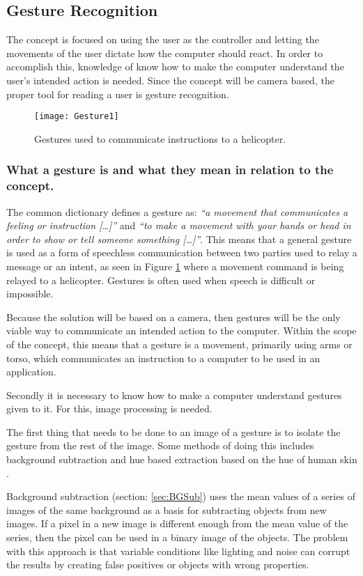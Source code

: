 \subsection{Gesture Recognition}
The concept is focused on using the user as the controller and letting the movements of the user dictate how the computer should react. In order to accomplish this, knowledge of know how to make the computer understand the user’s intended action is needed. Since the concept will be camera based, the proper tool for reading a user is gesture recognition.
\bigskip

\begin{figure}[h] 
\centering
\texttt{[image: Gesture1]} 
\caption{Gestures used to communicate instructions to a helicopter.}
\label{fig:Gesture1}
\end{figure}

\subsubsection*{What a gesture is and what they mean in relation to the concept.}
The common dictionary defines a gesture as: \textit{“a movement that communicates a feeling or instruction […]”} and \textit{“to make a movement with your hands or head in order to show or tell someone something […]”}. \parencite{Macmillan2005}
This means that a general gesture is used as a form of speechless communication between two parties used to relay a message or an intent, as seen in Figure \ref{fig:Gesture1} where a movement command is being relayed to a helicopter. Gestures is often used when speech is difficult or impossible.

Because the solution will be based on a camera, then gestures will be the only viable way to communicate an intended action to the computer. Within the scope of the concept, this means that a gesture is a movement, primarily using arms or torso, which communicates an instruction to a computer to be used in an application.
\bigskip

Secondly it is necessary to know how to make a computer understand gestures given to it. For this, image processing is needed.

The first thing that needs to be done to an image of a gesture is to isolate the gesture from the rest of the image. Some methods of doing this includes background subtraction and hue based extraction based on the hue of human skin \parencite{Busaryev}.
\bigskip

Background subtraction (section: \ref{sec:BGSub}) uses the mean values of a series of images of the same background as a basis for subtracting objects from new images. If a pixel in a new image is different enough from the mean value of the series, then the pixel can be used in a binary image of the objects. The problem with this approach is that variable conditions like lighting and noise can corrupt the results by creating false positives or objects with wrong properties. \parencite{Busaryev}
\bigskip

